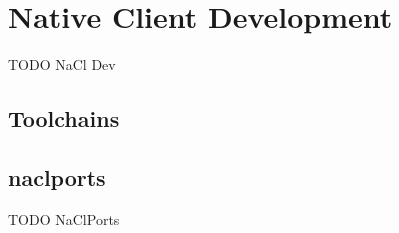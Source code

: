 \section{Native Client Development} %
\label{sec:native_client_development}
TODO NaCl Dev

\subsection{Toolchains} %
\label{sub:toolchains}


\subsection{naclports} %
\label{sub:naclports}
TODO NaClPorts

